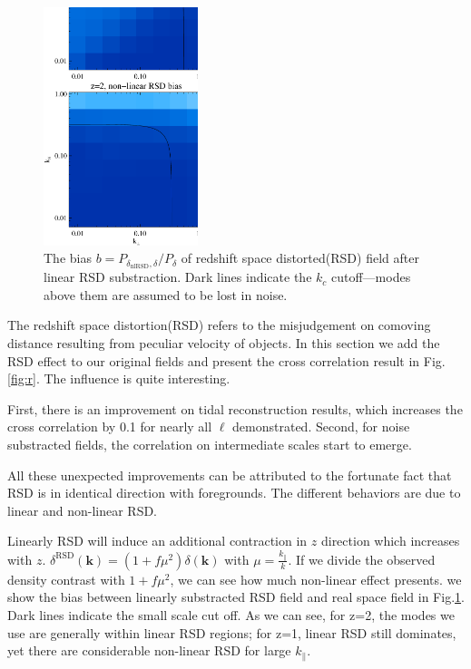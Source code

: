\begin{figure}%
\begin{center}
\includegraphics[width=0.4\textwidth]{compare_bias_rsdsub_z1z2.eps}
\end{center}
\vspace{-0.7cm}
\caption{The bias $b=P_{\delta_\mathrm{nlRSD},\delta}/P_{\delta}$ 
of redshift space distorted(RSD) field after linear RSD substraction.
Dark lines indicate the $k_c$ cutoff---modes above them are assumed to be lost in noise.}
\label{fig:bias}
\end{figure}
The redshift space distortion(RSD) refers to the misjudgement on comoving distance 
resulting from peculiar velocity of objects. 
In this section we add the RSD effect to our original fields and 
present the cross correlation result in Fig.\ref{fig:r}. 
The influence is quite interesting. 

First, there is an improvement on tidal reconstruction results, 
which increases the cross correlation by 0.1 for nearly all $\ell$ demonstrated. 
Second, for noise substracted fields, the correlation on intermediate scales start to emerge.  

All these unexpected improvements can be attributed to the fortunate fact 
that RSD is in identical direction with foregrounds. 
The different behaviors are due to linear and non-linear RSD. 

Linearly RSD will induce an additional contraction in $z$ direction 
which increases with $z$.  
$\delta^\mathrm{RSD}(\bm{k})=(1+f\mu^2)\delta(\bm{k})$ 
with $\mu=\frac{k_\parallel}{k}$. 
If we divide the observed density contrast with $1+f\mu^2$, 
we can see how much non-linear effect presents. 
we show the bias between linearly substracted RSD field 
and real space field  
in Fig.\ref{fig:bias}. 
Dark lines indicate the small scale cut off. 
As we can see, 
for z=2, the modes we use are generally 
within linear RSD regions; 
for z=1, linear RSD still dominates, yet there are considerable non-linear RSD for large $k_\parallel$.  

